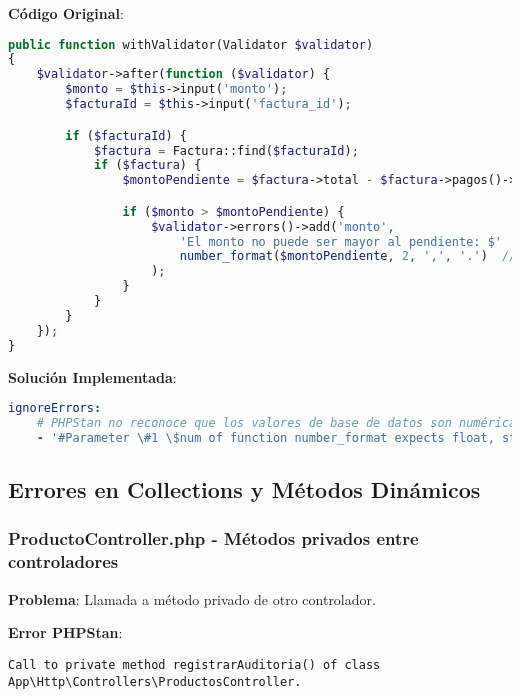 \documentclass[12pt,a4paper]{article}
\begin{document}
\textbf{Código Original}:
\begin{lstlisting}[language=php, caption=StorePagoRequest.php - Validación con number_format]
public function withValidator(Validator $validator)
{
    $validator->after(function ($validator) {
        $monto = $this->input('monto');
        $facturaId = $this->input('factura_id');

        if ($facturaId) {
            $factura = Factura::find($facturaId);
            if ($factura) {
                $montoPendiente = $factura->total - $factura->pagos()->sum('monto');

                if ($monto > $montoPendiente) {
                    $validator->errors()->add('monto',
                        'El monto no puede ser mayor al pendiente: $' .
                        number_format($montoPendiente, 2, ',', '.')  // Error: string esperado
                    );
                }
            }
        }
    });
}
\end{lstlisting}

\textbf{Solución Implementada}:
\begin{lstlisting}[language=yaml, caption=Ignorado para number_format con valores numéricos]
ignoreErrors:
    # PHPStan no reconoce que los valores de base de datos son numéricamente válidos
    - '#Parameter \#1 \$num of function number_format expects float, string given#'
\end{lstlisting}

\subsection{Errores en Collections y Métodos Dinámicos}

\subsubsection{ProductoController.php - Métodos privados entre controladores}

\textbf{Problema}: Llamada a método privado de otro controlador.

\textbf{Error PHPStan}:
\begin{lstlisting}[caption=Error en ProductoController.php]
Call to private method registrarAuditoria() of class App\Http\Controllers\ProductosController.
\end{lstlisting}
\end{document}
